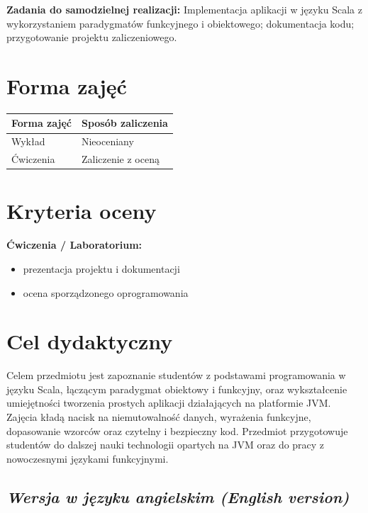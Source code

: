 \documentclass[12pt, a4paper]{article}
\newcommand{\thdrule}{\noalign{\global\setlength{\extrarowheight}{0pt}}}
\newcommand{\thdend}{\noalign{\global\setlength{\extrarowheight}{3pt}}}
\begin{document}
\vspace{4pt}
\noindent\textbf{Zadania do samodzielnej realizacji:} Implementacja aplikacji w języku Scala z wykorzystaniem paradygmatów funkcyjnego i obiektowego; dokumentacja kodu; przygotowanie projektu zaliczeniowego.

\section{Forma zajęć}

\begin{center}
{\scriptsize
\begin{tabular}{m{5cm}m{8cm}}
\thdrule\toprule
\rowcolor{pjatkRed} {\color{white}\textbf{Forma zajęć}} & {\color{white}\textbf{Sposób zaliczenia}} \\
\midrule\thdend
  \rowcolor{tableRowLight} Wykład & Nieoceniany \\
  \rowcolor{tableRowAlt} Ćwiczenia & Zaliczenie z oceną \\
\bottomrule
\end{tabular}}
\end{center}

\section{Kryteria oceny}

\textbf{Ćwiczenia / Laboratorium:}
\begin{itemize}
  \item prezentacja projektu i dokumentacji
  \item ocena sporządzonego oprogramowania
\end{itemize}


\section{Cel dydaktyczny}

Celem przedmiotu jest zapoznanie studentów z podstawami programowania w języku Scala, łączącym paradygmat obiektowy i funkcyjny, oraz wykształcenie umiejętności tworzenia prostych aplikacji działających na platformie JVM. Zajęcia kładą nacisk na niemutowalność danych, wyrażenia funkcyjne, dopasowanie wzorców oraz czytelny i bezpieczny kod. Przedmiot przygotowuje studentów do dalszej nauki technologii opartych na JVM oraz do pracy z nowoczesnymi językami funkcyjnymi.

\subsection*{\textit{Wersja w języku angielskim (English version)}}
\end{document}
